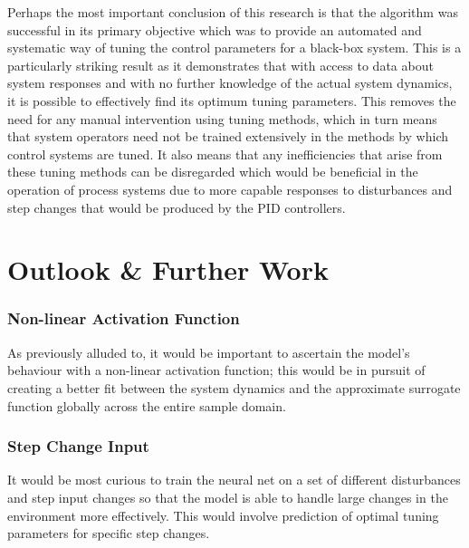 \documentclass[conference]{IEEEtran}
\theoremstyle{definition}
\begin{document}
Perhaps the most important conclusion of this research is that the algorithm was successful in its primary objective which was to provide an automated and systematic way of tuning the control parameters for a black-box system. This is a particularly striking result as it demonstrates that with access to data about system responses and with no further knowledge of the actual system dynamics, it is possible to effectively find its optimum tuning parameters. This removes the need for any manual intervention using tuning methods, which in turn means that system operators need not be trained extensively in the methods by which control systems are tuned. It also means that any inefficiencies that arise from these tuning methods can be disregarded which would be beneficial in the operation of process systems due to more capable responses to disturbances and step changes that would be produced by the PID controllers. 

\section{Outlook \& Further Work}
\subsubsection{Non-linear Activation Function}
As previously alluded to, it would be important to ascertain the model's behaviour with a non-linear activation function; this would be in pursuit of creating a better fit between the system dynamics and the approximate surrogate function globally across the entire sample domain.
\vspace{0.5mm}
\subsubsection{Step Change Input}
It would be most curious to train the neural net on a set of different disturbances and step input changes so that the model is able to handle large changes in the environment more effectively. This would involve prediction of optimal tuning parameters for specific step changes. 
\vspace{0.5mm}
\end{document}
